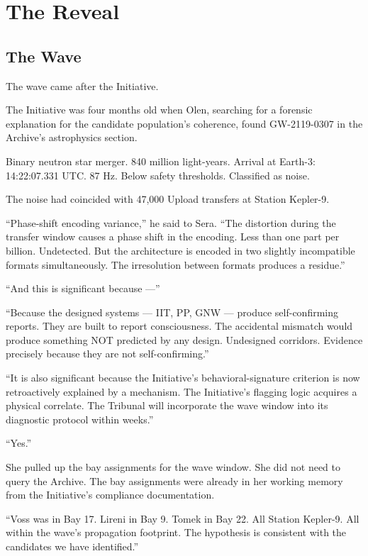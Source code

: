 \part{The Reveal}

\chapter{The Wave}

\noindent The wave came after the Initiative.

The Initiative was four months old when Olen, searching for a forensic explanation for the candidate population's coherence, found GW-2119-0307 in the Archive's astrophysics section.

Binary neutron star merger. 840 million light-years. Arrival at Earth-3: 14:22:07.331 UTC. 87 Hz. Below safety thresholds. Classified as noise.

The noise had coincided with 47,000 Upload transfers at Station Kepler-9.

\enquote{Phase-shift encoding variance,} he said to Sera. \enquote{The distortion during the transfer window causes a phase shift in the encoding. Less than one part per billion. Undetected. But the architecture is encoded in two slightly incompatible formats simultaneously. The irresolution between formats produces a residue.}

\enquote{And this is significant because —}

\enquote{Because the designed systems — IIT, PP, GNW — produce self-confirming reports. They are built to report consciousness. The accidental mismatch would produce something NOT predicted by any design. Undesigned corridors. Evidence precisely because they are not self-confirming.}

\enquote{It is also significant because the Initiative's behavioral-signature criterion is now retroactively explained by a mechanism. The Initiative's flagging logic acquires a physical correlate. The Tribunal will incorporate the wave window into its diagnostic protocol within weeks.}

\enquote{Yes.}

She pulled up the bay assignments for the wave window. She did not need to query the Archive. The bay assignments were already in her working memory from the Initiative's compliance documentation.

\enquote{Voss was in Bay 17. Lireni in Bay 9. Tomek in Bay 22. All Station Kepler-9. All within the wave's propagation footprint. The hypothesis is consistent with the candidates we have identified.}

